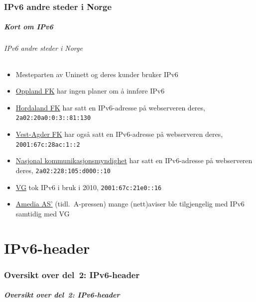 \section{IPv6 andre steder i Norge}
\begin{frame}%
  \frametitle{Kort om IPv6}
  \framesubtitle{IPv6 andre steder i Norge}
  \pause
  \begin{itemize}[<+->]
  \item Mesteparten av Uninett og deres kunder bruker IPv6
  \item \href{http://www.oppland.no/}{Oppland FK} har ingen
    planer om å innføre IPv6
  \item \href{http://www.hordaland.no/}{Hordaland FK} har satt en
    IPv6-adresse på webserveren deres, \texttt{2a02:20a0:0:3::81:130}
  \item \href{http://www.vaf.no/}{Vest-Agder FK} har også satt en
    IPv6-adresse på webserveren deres, \texttt{2001:67c:28ac:1::2}
  \item \href{http://www.nkom.no/}{Nasjonal kommunikasjonsmyndighet}
    har satt en IPv6-adresse på webserveren deres,
    \texttt{2a02:228:105:d000::10}
  \item \href{http://vg.no/}{VG} tok IPv6 i bruk i 2010,
    \texttt{2001:67c:21e0::16}
  \item \href{http://www.amedia.no/}{Amedia AS'} (tidl.\ A-pressen) mange
    (nett)aviser ble tilgjengelig med IPv6 samtidig med VG
  \end{itemize}
\end{frame}

\part{IPv6-header}

\begin{frame}
  \partpage
\end{frame}

\section*{Oversikt over del~2: IPv6-header}
\begin{frame}[allowframebreaks]
  \frametitle{Oversikt over del~2: IPv6-header}
    \tableofcontents%
\end{frame}

